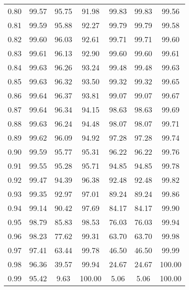 \begin{tabular}{|c|c|c|c|c|c|c|}
      0.80 &     99.57 &     95.75 &      91.98 &   99.83 &      99.83 &         99.56 \\
      0.81 &     99.59 &     95.88 &      92.27 &   99.79 &      99.79 &         99.58 \\
      0.82 &     99.60 &     96.03 &      92.61 &   99.71 &      99.71 &         99.60 \\
      0.83 &     99.61 &     96.13 &      92.90 &   99.60 &      99.60 &         99.61 \\
      0.84 &     99.63 &     96.26 &      93.24 &   99.48 &      99.48 &         99.63 \\
      0.85 &     99.63 &     96.32 &      93.50 &   99.32 &      99.32 &         99.65 \\
      0.86 &     99.64 &     96.37 &      93.81 &   99.07 &      99.07 &         99.67 \\
      0.87 &     99.64 &     96.34 &      94.15 &   98.63 &      98.63 &         99.69 \\
      0.88 &     99.63 &     96.24 &      94.48 &   98.07 &      98.07 &         99.71 \\
      0.89 &     99.62 &     96.09 &      94.92 &   97.28 &      97.28 &         99.74 \\
      0.90 &     99.59 &     95.77 &      95.31 &   96.22 &      96.22 &         99.76 \\
      0.91 &     99.55 &     95.28 &      95.71 &   94.85 &      94.85 &         99.78 \\
      0.92 &     99.47 &     94.39 &      96.38 &   92.48 &      92.48 &         99.82 \\
      0.93 &     99.35 &     92.97 &      97.01 &   89.24 &      89.24 &         99.86 \\
      0.94 &     99.14 &     90.42 &      97.69 &   84.17 &      84.17 &         99.90 \\
      0.95 &     98.79 &     85.83 &      98.53 &   76.03 &      76.03 &         99.94 \\
      0.96 &     98.23 &     77.62 &      99.31 &   63.70 &      63.70 &         99.98 \\
      0.97 &     97.41 &     63.44 &      99.78 &   46.50 &      46.50 &         99.99 \\
      0.98 &     96.36 &     39.57 &      99.94 &   24.67 &      24.67 &        100.00 \\
      0.99 &     95.42 &      9.63 &     100.00 &    5.06 &       5.06 &        100.00 \\
\bottomrule
\end{tabular}
